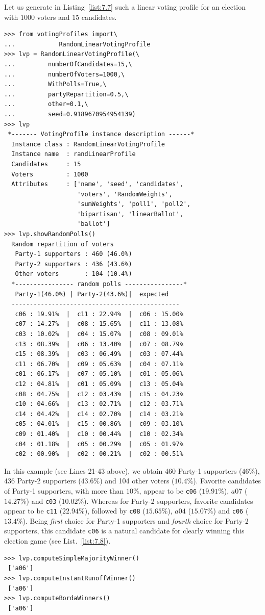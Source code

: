 Let us generate in Listing~\vref{list:7.7} such a linear voting profile for an election with $1000$ voters and $15$ candidates.
\begin{lstlisting}[caption={Generating a linear voting profile with random polls},label=list:7.7]
>>> from votingProfiles import\
...            RandomLinearVotingProfile
>>> lvp = RandomLinearVotingProfile(\
...         numberOfCandidates=15,\
...         numberOfVoters=1000,\
...         WithPolls=True,\
...         partyRepartition=0.5,\
...         other=0.1,\
...         seed=0.9189670954954139)
>>> lvp
 *------- VotingProfile instance description ------*
  Instance class : RandomLinearVotingProfile
  Instance name  : randLinearProfile
  Candidates     : 15
  Voters         : 1000
  Attributes     : ['name', 'seed', 'candidates',
                    'voters', 'RandomWeights',
                    'sumWeights', 'poll1', 'poll2',
                    'bipartisan', 'linearBallot',
                    'ballot']
>>> lvp.showRandomPolls()
  Random repartition of voters
   Party-1 supporters : 460 (46.0%)
   Party-2 supporters : 436 (43.6%)
   Other voters       : 104 (10.4%)
  *---------------- random polls ----------------*
   Party-1(46.0%) | Party-2(43.6%)|  expected  
  ----------------------------------------------
   c06 : 19.91%  |  c11 : 22.94%  |  c06 : 15.00%
   c07 : 14.27%  |  c08 : 15.65%  |  c11 : 13.08%
   c03 : 10.02%  |  c04 : 15.07%  |  c08 : 09.01%
   c13 : 08.39%  |  c06 : 13.40%  |  c07 : 08.79%
   c15 : 08.39%  |  c03 : 06.49%  |  c03 : 07.44%
   c11 : 06.70%  |  c09 : 05.63%  |  c04 : 07.11%
   c01 : 06.17%  |  c07 : 05.10%  |  c01 : 05.06%
   c12 : 04.81%  |  c01 : 05.09%  |  c13 : 05.04%
   c08 : 04.75%  |  c12 : 03.43%  |  c15 : 04.23%
   c10 : 04.66%  |  c13 : 02.71%  |  c12 : 03.71%
   c14 : 04.42%  |  c14 : 02.70%  |  c14 : 03.21%
   c05 : 04.01%  |  c15 : 00.86%  |  c09 : 03.10%
   c09 : 01.40%  |  c10 : 00.44%  |  c10 : 02.34%
   c04 : 01.18%  |  c05 : 00.29%  |  c05 : 01.97%
   c02 : 00.90%  |  c02 : 00.21%  |  c02 : 00.51%
\end{lstlisting}

In this example (see Lines 21-43 above), we obtain 460 Party-1 supporters ($46\%$), 436 Party-2 supporters ($43.6\%$) and 104 other voters ($10.4\%$). Favorite candidates of Party-1 supporters, with more than $10\%$, appear to be \texttt{c06} ($19.91\%$), $a07$ ($14.27\%$) and \texttt{c03} ($10.02\%$). Whereas for Party-2 supporters, favorite candidates appear to be \texttt{c11} ($22.94\%$), followed by \texttt{c08} ($15.65\%$), $a04$ ($15.07\%$) and \texttt{c06} ($13.4\%$). Being \emph{first} choice for Party-1 supporters and \emph{fourth} choice for Party-2 supporters, this candidate \texttt{c06} is a natural candidate for clearly winning this election game (see List.~\vref{list:7.8}).
\begin{lstlisting}[caption={The uninominal and \Borda election winner},label=list:7.8]
>>> lvp.computeSimpleMajorityWinner()
 ['a06']
>>> lvp.computeInstantRunoffWinner()
 ['a06']  
>>> lvp.computeBordaWinners()
 ['a06']
\end{lstlisting}


